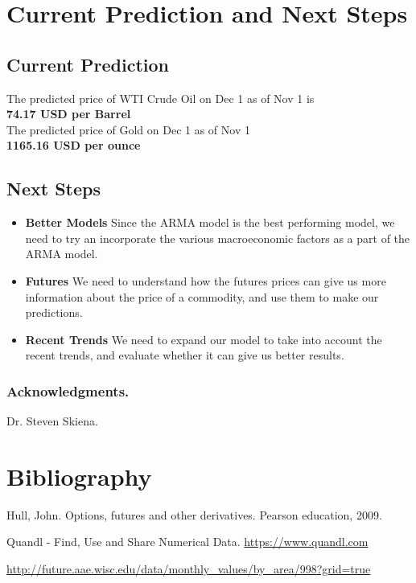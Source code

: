 \documentclass[runningheads]{llncs}
\begin{document}
\newpage
\section{Current Prediction and Next Steps}

\subsection {Current Prediction}
\noindent The predicted price of WTI Crude Oil on Dec 1 as of Nov 1 is \\
\textbf{74.17 USD per Barrel} \\

\noindent The predicted price of Gold on Dec 1 as of Nov 1 \\
\textbf{1165.16 USD per ounce} \\

\subsection {Next Steps}

\begin{itemize}
\item \textbf{Better Models} Since the ARMA model is the best performing model, we need to try an incorporate the various macroeconomic factors as a part of the ARMA model. 
\item \textbf{Futures} We need to understand how the futures prices can give us more information about the price of a commodity, and use them to make our predictions.
\item \textbf{Recent Trends} We need to expand our model to take into account the recent trends, and evaluate whether it can give us better results. 
\end{itemize}

\subsubsection*{Acknowledgments.} Dr. Steven Skiena.

\section{Bibliography}\label{references}

\begin{thebibliography}{4}

 Hull, John. Options, futures and other derivatives. Pearson education, 2009.

 Quandl - Find, Use and Share Numerical Data. \url{https://www.quandl.com}

\url{http://future.aae.wisc.edu/data/monthly_values/by_area/998?grid=true}

\end{thebibliography}
\end{document}
